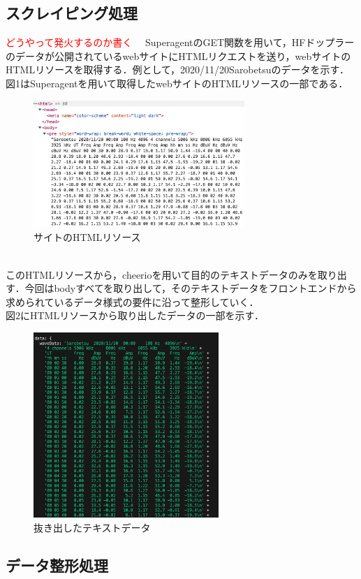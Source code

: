 \subsection{スクレイピング処理}
\textcolor{red}{どうやって発火するのか書く}
　SuperagentのGET関数を用いて，HFドップラーのデータが公開されているwebサイト\cite{hfd_link}にHTMLリクエストを送り，webサイトのHTMLリソースを取得する．例として，2020/11/20Sarobetsuのデータを示す．図1はSuperagentを用いて取得したwebサイトのHTMLリソースの一部である．\\
\begin{figure}[h]
  \centering
  \includegraphics[width=80mm]{fig/htmlRes.png}
  \caption{サイトのHTMLリソース}
\end{figure}\\
このHTMLリソースから，cheerioを用いて目的のテキストデータのみを取り出す．今回はbodyすべてを取り出して，そのテキストデータをフロントエンドから求められているデータ様式の要件に沿って整形していく．\\
図2にHTMLリソースから取り出したデータの一部を示す．
\begin{figure}[h]
   \centering
   \includegraphics[width=70mm]{fig/textData.png}
   \caption{抜き出したテキストデータ}
\end{figure}

\subsection{データ整形処理}

